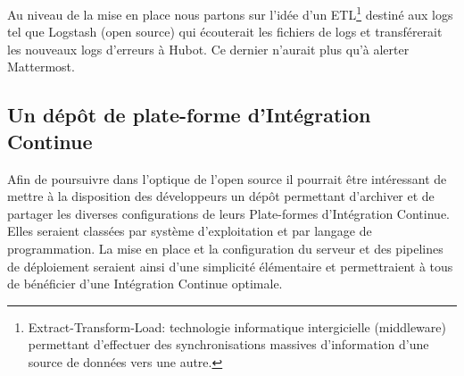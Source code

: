       Au niveau de la mise en place nous partons sur l'idée d'un \gls{ETL}\footnote{Extract-Transform-Load: technologie informatique intergicielle (middleware) permettant d'effectuer des synchronisations massives d'information d'une source de données vers une autre.} destiné aux logs tel que Logstash (open source) qui écouterait les fichiers de logs et transférerait les nouveaux logs d'erreurs à Hubot. Ce dernier n'aurait plus qu'à alerter Mattermost.

      \subsection{Un dépôt de plate-forme d'Intégration Continue}
      Afin de poursuivre dans l'optique de l'open source il pourrait être intéressant de mettre à la disposition des développeurs un dépôt permettant d'archiver et de partager les diverses configurations de leurs Plate-formes d'Intégration Continue. Elles seraient classées par système d'exploitation et par langage de programmation. La mise en place et la configuration du serveur et des pipelines de déploiement seraient ainsi d'une simplicité élémentaire et permettraient à tous de bénéficier d'une Intégration Continue optimale.
